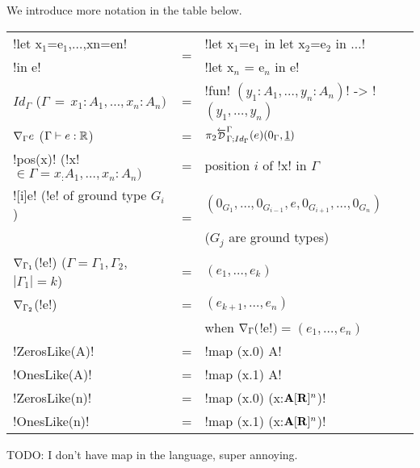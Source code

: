 \begin{notation}
We introduce more notation in the table below.\\

\begin{tabular}{|l c l|}
    \hline
    !let x$_{1}$=e$_{1}$,$\ldots$,xn=en!  & \multirow{2}{*}{=} & !let x$_{1}$=e$_{1}$ in let x$_{2}$=e$_{2}$ in $\ldots$! \\
    !in e! && !let x$_n$ = e$_n$ in e!\\ \hline
    $Id_\Gamma$ \quad\quad\quad ($\Gamma \, = \, x_1:A_1,\ldots,x_n:A_n)$ & = & !fun! $(y_1:A_1,\ldots,y_n:A_n)$! -> !$(y_1,\ldots,y_n)$ \\ \hline
    $\nabla_\Gamma e$ \quad\quad\hspace{0.6em}($\Gamma\vdash e:\mathbb{R}$) & = & $\pi_2\directD{\Gamma}{\Gamma}{Id_\Gamma}(e)(0_\Gamma,\underline{1})$ \\ \hline
    !pos(x)! \quad(!x!$\in\Gamma=x_:A_1,\ldots,x_n:A_n)$ & = & position $i$ of !x! in $\Gamma$ \\ \hline
    ![i]e! \quad\quad(!e! of ground type $G_i$) & \multirow{2}{*}{=} &  $(0_{G_1},\ldots,0_{G_{i-1}},e,0_{G_{i+1}},\ldots,0_{G_n})$ \\
    && ($G_j$ are ground types) \\ \hline
    $\nabla_{\Gamma_1}$(!e!) \quad\quad($\Gamma=\Gamma_1,\Gamma_2$, $|\Gamma_1|=k$)& = & $(e_1,\ldots,e_k)$ \\
    $\nabla_{\Gamma_2}$(!e!) & = & $(e_{k+1},\ldots,e_n)$ \\
    && when $\nabla_{\Gamma}($!e!$) = (e_1,\ldots,e_n)$ \\ \hline
    !ZerosLike(A)! & = & !map (x.0) A! \\ \hline
    !OnesLike(A)! & = & !map (x.1) A! \\ \hline
    !ZerosLike(n)! & = & !map (x.0) (x:$\mathbf{A}[\mathbf{R}]^{n}$)! \\ \hline
    !OnesLike(n)! & = & !map (x.1) (x:$\mathbf{A}[\mathbf{R}]^{n}$)! \\ \hline
\end{tabular}
TODO: I don't have map in the language, super annoying.
\end{notation}
